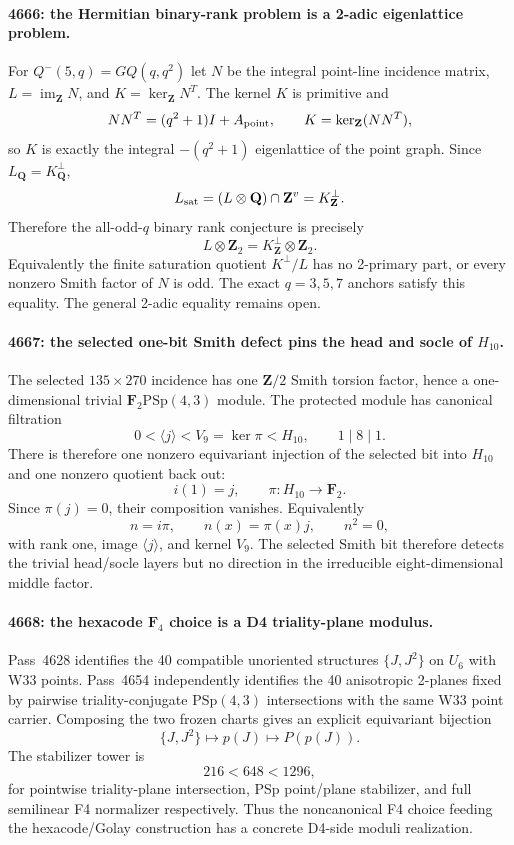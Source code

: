 \paragraph{4666: the Hermitian binary-rank problem is a 2-adic eigenlattice problem.}
For $Q^-(5,q)=GQ(q,q^2)$ let $N$ be the integral point-line incidence matrix,
$L=\operatorname{im}_{\mathbf Z}N$, and $K=\ker_{\mathbf Z}N^T$.  The kernel $K$
is primitive and
\[
 NN^T=(q^2+1)I+A_{\rm point},
 \qquad
 K=\ker_{\mathbf Z}(NN^T),
\]
so $K$ is exactly the integral $-(q^2+1)$ eigenlattice of the point graph.
Since $L_{\mathbf Q}=K_{\mathbf Q}^{\perp}$,
\[
 L_{\rm sat}=(L\otimes\mathbf Q)\cap\mathbf Z^v=K_{\mathbf Z}^{\perp}.
\]
Therefore the all-odd-$q$ binary rank conjecture is precisely
\[
 \boxed{L\otimes\mathbf Z_2=K_{\mathbf Z}^{\perp}\otimes\mathbf Z_2.}
\]
Equivalently the finite saturation quotient $K^{\perp}/L$ has no 2-primary part,
or every nonzero Smith factor of $N$ is odd.  The exact $q=3,5,7$ anchors satisfy
this equality.  The general 2-adic equality remains open.

\paragraph{4667: the selected one-bit Smith defect pins the head and socle of $H_{10}$.}
The selected $135\times270$ incidence has one $\mathbf Z/2$ Smith torsion factor,
hence a one-dimensional trivial $\mathbf F_2\mathrm{PSp}(4,3)$ module.  The
protected module has canonical filtration
\[
0<\langle j\rangle<V_9=\ker\pi<H_{10},
\qquad 1\mid8\mid1.
\]
There is therefore one nonzero equivariant injection of the selected bit into
$H_{10}$ and one nonzero quotient back out:
\[
 i(1)=j,\qquad \pi:H_{10}\to\mathbf F_2.
\]
Since $\pi(j)=0$, their composition vanishes.  Equivalently
\[
 n=i\pi,\qquad n(x)=\pi(x)j,\qquad n^2=0,
\]
with rank one, image $\langle j\rangle$, and kernel $V_9$.  The selected Smith
bit therefore detects the trivial head/socle layers but no direction in the
irreducible eight-dimensional middle factor.

\paragraph{4668: the hexacode $\mathbf F_4$ choice is a D4 triality-plane modulus.}
Pass~4628 identifies the 40 compatible unoriented structures $\{J,J^2\}$ on
$U_6$ with W33 points.  Pass~4654 independently identifies the 40 anisotropic
2-planes fixed by pairwise triality-conjugate $\mathrm{PSp}(4,3)$ intersections
with the same W33 point carrier.  Composing the two frozen charts gives an
explicit equivariant bijection
\[
 \{J,J^2\}\longmapsto p(J)\longmapsto P(p(J)).
\]
The stabilizer tower is
\[
216<648<1296,
\]
for pointwise triality-plane intersection, PSp point/plane stabilizer, and full
semilinear F4 normalizer respectively.  Thus the noncanonical F4 choice feeding
the hexacode/Golay construction has a concrete D4-side moduli realization.

